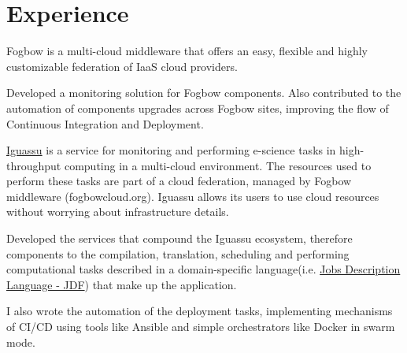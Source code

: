 \documentclass[]{deedy-resume-openfont}
\begin{document}
\begin{minipage}[t]{0.66\textwidth} 


\section{Experience}


\vspace{\topsep} %
\begin{tightemize}
\item Fogbow is a multi-cloud middleware that offers an easy, flexible and highly customizable federation of IaaS cloud providers. 
\item Developed a monitoring solution for Fogbow components. Also contributed to the automation of components upgrades across Fogbow sites, improving the flow of Continuous Integration and Deployment.
\end{tightemize}
\sectionsep


\vspace{\topsep} %
\begin{tightemize}
\item \href{https://github.com/ufcg-lsd/iguassu}{Iguassu} is a service for monitoring and performing e-science tasks in high-throughput computing in a multi-cloud environment. The resources used to perform these tasks are part of a cloud federation, managed by Fogbow middleware (fogbowcloud.org). Iguassu allows its users to use cloud resources without worrying about infrastructure details.
\item Developed the services that compound the Iguassu ecosystem, therefore components to the compilation, translation, scheduling and performing computational tasks described in a domain-specific language(i.e. \href{http://ourgrid.lsd.ufcg.edu.br/use.php#site1}{Jobs Description Language - JDF}) that make up the application.
\item I also wrote the automation of the deployment tasks, implementing mechanisms of CI/CD using tools like Ansible and simple orchestrators like Docker in swarm mode.
\end{tightemize}
\sectionsep


\end{minipage}
\end{document}
